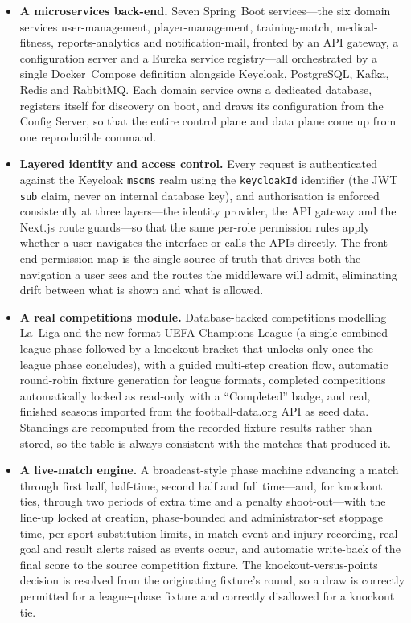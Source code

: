 \begin{itemize}
  \item \textbf{A microservices back-end.} Seven Spring~Boot services---the six domain
        services user-management, player-management, training-match, medical-fitness,
        reports-analytics and notification-mail, fronted by an API gateway, a configuration
        server and a Eureka service registry---all orchestrated by a single Docker~Compose
        definition alongside Keycloak, PostgreSQL, Kafka, Redis and RabbitMQ. Each domain
        service owns a dedicated database, registers itself for discovery on boot, and
        draws its configuration from the Config Server, so that the entire control plane
        and data plane come up from one reproducible command.

  \item \textbf{Layered identity and access control.} Every request is authenticated
        against the Keycloak \texttt{mscms} realm using the \texttt{keycloakId}
        identifier (the JWT \texttt{sub} claim, never an internal database key), and
        authorisation is enforced consistently at three layers---the identity provider, the
        API gateway and the Next.js route guards---so that the same per-role permission
        rules apply whether a user navigates the interface or calls the APIs directly. The
        front-end permission map is the single source of truth that drives both the
        navigation a user sees and the routes the middleware will admit, eliminating drift
        between what is shown and what is allowed.

  \item \textbf{A real competitions module.} Database-backed competitions modelling
        La~Liga and the new-format UEFA Champions League (a single combined league phase
        followed by a knockout bracket that unlocks only once the league phase concludes),
        with a guided multi-step creation flow, automatic round-robin fixture generation
        for league formats, completed competitions automatically locked as read-only with a
        ``Completed'' badge, and real, finished seasons imported from the football-data.org
        API as seed data. Standings are recomputed from the recorded fixture results rather
        than stored, so the table is always consistent with the matches that produced it.

  \item \textbf{A live-match engine.} A broadcast-style phase machine advancing a match
        through first half, half-time, second half and full time---and, for knockout
        ties, through two periods of extra time and a penalty shoot-out---with the line-up
        locked at creation, phase-bounded and administrator-set stoppage time, per-sport
        substitution limits, in-match event and injury recording, real goal and result
        alerts raised as events occur, and automatic write-back of the final score to the
        source competition fixture. The knockout-versus-points decision is resolved from
        the originating fixture's round, so a draw is correctly permitted for a league-phase
        fixture and correctly disallowed for a knockout tie.


\end{itemize}
